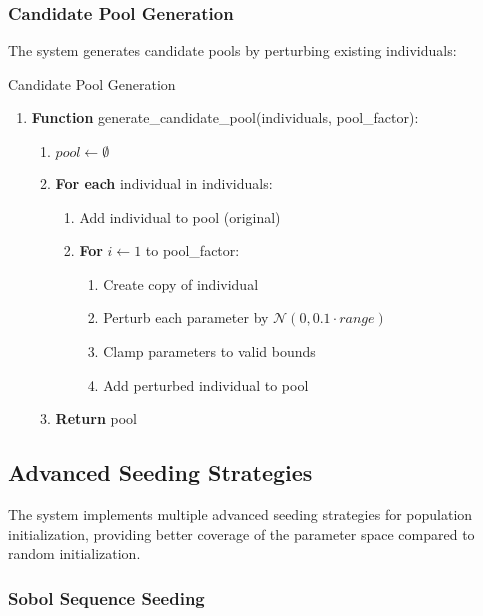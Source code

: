 \documentclass[12pt,a4paper]{article}
\begin{document}
\subsubsection{Candidate Pool Generation}

The system generates candidate pools by perturbing existing individuals:

\begin{algorithm}
\caption{Candidate Pool Generation}
\begin{enumerate}
    \item \textbf{Function} generate\_candidate\_pool(individuals, pool\_factor):
    \begin{enumerate}
        \item $pool \leftarrow \emptyset$
        \item \textbf{For each} individual in individuals:
        \begin{enumerate}
            \item Add individual to pool (original)
            \item \textbf{For} $i \leftarrow 1$ to pool\_factor:
            \begin{enumerate}
                \item Create copy of individual
                \item Perturb each parameter by $\mathcal{N}(0, 0.1 \cdot range)$
                \item Clamp parameters to valid bounds
                \item Add perturbed individual to pool
            \end{enumerate}
        \end{enumerate}
        \item \textbf{Return} pool
    \end{enumerate}
\end{enumerate}
\end{algorithm}

\subsection{Advanced Seeding Strategies}

The system implements multiple advanced seeding strategies for population initialization, providing better coverage of the parameter space compared to random initialization.

\subsubsection{Sobol Sequence Seeding}
\end{document}
